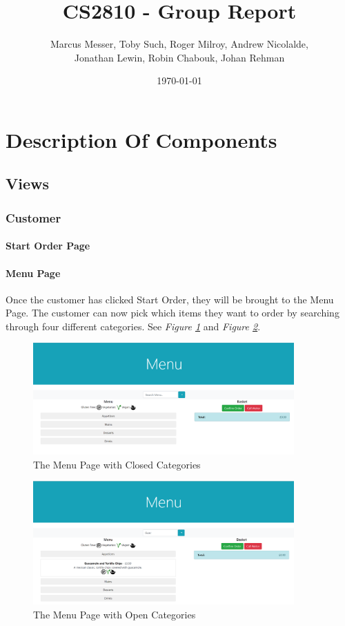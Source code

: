 \documentclass[12pt, twoside, a4paper]{report}
\title{CS2810 - Group Report}
\author{Marcus Messer, Toby Such, Roger Milroy, Andrew Nicolalde,\\
Jonathan Lewin, Robin Chabouk, Johan Rehman}
\date{\today}
\begin{document}
\maketitle
\pagestyle{fancy}
\fancyhf{}

\chapter*{Description Of Components}
\section*{Views}
\subsection*{Customer}
\subsubsection*{Start Order Page}

\subsubsection*{Menu Page}
Once the customer has clicked Start Order, they will be brought to the Menu Page. The customer can now pick which items they want to order by searching through four different categories. See \textit{Figure \ref{fig:menuClosed}} and \textit{Figure \ref{fig:menuOpen}}.

\begin{figure}[H]
  \centering
  \includegraphics[width=10cm]{MenuClosed.png}
  \caption{The Menu Page with Closed Categories}
  \label{fig:menuClosed}
\end{figure}

\begin{figure}[H]
  \centering
  \includegraphics[width=10cm]{MenuOpen.png}
  \caption{The Menu Page with Open Categories}
  \label{fig:menuOpen}
\end{figure}
\end{document}
